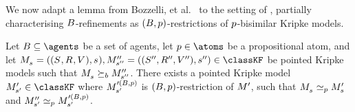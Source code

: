 We now adapt a lemma from Bozzelli, et al.~\cite{bozzelli:2014b} to the setting of \classKF{}, partially characterising $\agentsB$-refinements as $(\agentsB, \atomP)$-restrictions of $\atomP$-bisimilar Kripke models.

\begin{lemma}\label{rml-k4-refinement-p-bisimulation}
Let $\agentsB \subseteq \agents$ be a set of agents, let $\atomP \in \atoms$ be a propositional atom, and let $\kPModelAndTuple{\kStateS}, \kPModelAndTuplePP{\kStateSPP} \in \classKF$ be pointed Kripke models such that $\kPModel{\kStateS} \simulatesB \kPModelPP{\kStateSPP}$.
There exists a pointed Kripke model $\kPModelP{\kStateSP} \in \classKF$ where $\kPModel[\prime(\agentsB, \atomP)]{\kStateSP}$ is $(\agentsB, \atomP)$-restriction of $\kModelP$, such that $\kPModel{\kStateS} \bisimilar[\atomP] \kPModelP{\kStateS}$ and $\kPModelPP{\kStateSP} \bisimilar[\atomP] \kPModel[\prime(\agentsB, \atomP)]{\kStateSP}$.
\end{lemma}

